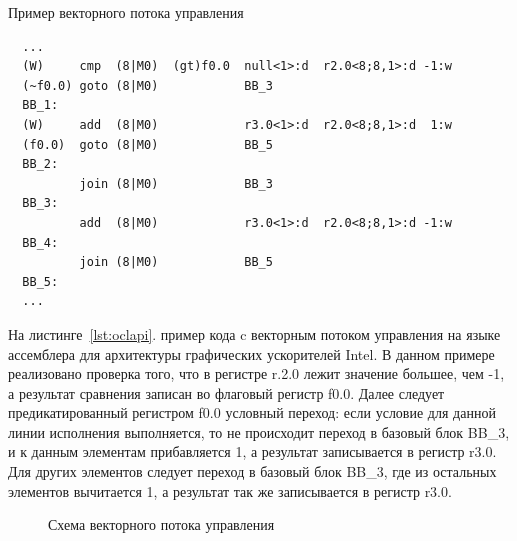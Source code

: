 \begin{ListingEnv}[!h]
    \captiondelim{ } 
    \caption{Пример векторного потока управления}\label{lst:simdcf}
    \begin{verbatim}
  ...
  (W)     cmp  (8|M0)  (gt)f0.0  null<1>:d  r2.0<8;8,1>:d -1:w
  (~f0.0) goto (8|M0)            BB_3
  BB_1:
  (W)     add  (8|M0)            r3.0<1>:d  r2.0<8;8,1>:d  1:w
  (f0.0)  goto (8|M0)            BB_5
  BB_2:
          join (8|M0)            BB_3
  BB_3:
          add  (8|M0)            r3.0<1>:d  r2.0<8;8,1>:d -1:w
  BB_4:
          join (8|M0)            BB_5
  BB_5:
  ...
    \end{verbatim}
\end{ListingEnv}

На листинге~\cref{lst:oclapi}. пример кода c векторным потоком управления на языке ассемблера для архитектуры графических ускорителей Intel. В данном примере реализовано проверка того, что в регистре r.2.0 лежит значение большее, чем -1, а результат сравнения записан во флаговый регистр f0.0. Далее следует предикатированный регистром f0.0 условный переход: если условие для данной линии исполнения выполняется, то не происходит переход в базовый блок BB\_3, и к данным элементам прибавляется 1, а результат записывается в регистр r3.0. Для других элементов следует переход в базовый блок BB\_3, где из остальных элементов вычитается 1, а результат так же записывается в регистр r3.0.

\begin{figure}[ht]
    \caption{Схема векторного потока управления}\label{fig:HW-goto-example}
\end{figure}

